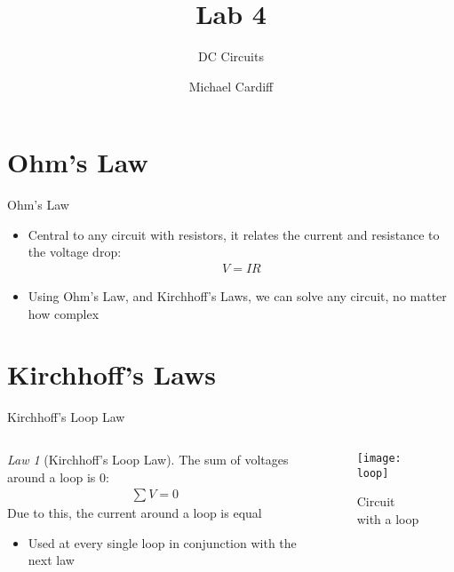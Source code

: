 \documentclass{beamer}
\title{Lab 4}
\author{Michael Cardiff}
\subtitle{DC Circuits}
\theoremstyle{remark}
\newtheorem{law}{Law}
\begin{document}
\begin{frame}
  \titlepage
\end{frame}

\section{Ohm's Law}
\begin{frame}{Ohm's Law}
  \begin{itemize}
  \item Central to any circuit with resistors, it relates the current and resistance to the voltage drop:
    \begin{align*}
      V=IR
    \end{align*}
  \item Using Ohm's Law, and Kirchhoff's Laws, we can solve any circuit, no matter how complex
  \end{itemize}
\end{frame}

\section{Kirchhoff's Laws}
\begin{frame}{Kirchhoff's Loop Law}
  \begin{columns}
    \begin{column}{0.5\textwidth}
      \begin{law}[Kirchhoff's Loop Law]
        The sum of voltages around a loop is 0:
        \begin{align*}
          \sum V=0
        \end{align*}
        Due to this, the current around a loop is equal
      \end{law}
      \begin{itemize}
      \item Used at every single loop in conjunction with the next law
      \end{itemize}
    \end{column}
    \begin{column}{0.5\textwidth}
      \begin{figure}[H]
        \centering
        \texttt{[image: loop]}
        \caption{Circuit with a loop}
      \end{figure}
    \end{column}
  \end{columns}
\end{frame}
\end{document}
